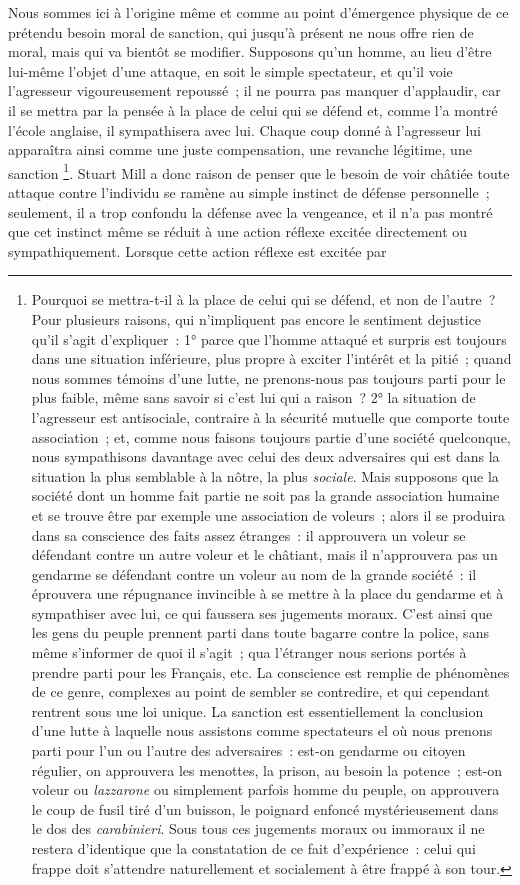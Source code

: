 \documentclass[french,twoside]{book} %
\begin{document}
Nous sommes ici à l’origine même et comme au point d’émergence physique de ce prétendu besoin moral de sanction, qui jusqu’à présent ne nous offre rien de moral, mais qui va bientôt se modifier. Supposons qu’un homme, au lieu d’être lui-même l’objet d’une attaque, en soit le simple spectateur, et qu’il voie l’agresseur vigoureusement repoussé ; il ne pourra pas manquer d’applaudir, car il se mettra par la pensée à la place de celui qui se défend et, comme l’a montré l’école anglaise, il sympathisera avec lui. Chaque coup donné à l’agresseur lui apparaîtra ainsi comme une juste compensation, une revanche légitime, une sanction \footnote{Pourquoi se mettra-t-il à la place de celui qui se défend, et non de l’autre ? Pour plusieurs raisons, qui n’impliquent pas encore le sentiment dejustice qu’il s’agit d’expliquer : 1° parce que l’homme attaqué et surpris est toujours dans une situation inférieure, plus propre à exciter l’intérêt et la pitié ; quand nous sommes témoins d’une lutte, ne prenons-nous pas toujours parti pour le plus faible, même sans savoir si c’est lui qui a raison ? 2° la situation de l’agresseur est antisociale, contraire à la sécurité mutuelle que comporte toute association ; et, comme nous faisons toujours partie d’une société quelconque, nous sympathisons davantage avec celui des deux adversaires qui est dans la situation la plus semblable à la nôtre, la plus \emph{sociale}. Mais supposons que la société dont un homme fait partie ne soit pas la grande association humaine et se trouve être par exemple une association de voleurs ; alors il se produira dans sa conscience des faits assez étranges : il approuvera un voleur se défendant contre un autre voleur et le châtiant, mais il n’approuvera pas un gendarme se défendant contre un voleur au nom de la grande société : il éprouvera une répugnance invincible à se mettre à la place du gendarme et à sympathiser avec lui, ce qui faussera ses jugements moraux. C’est ainsi que les gens du peuple prennent parti dans toute bagarre contre la police, sans même s’informer de quoi il s’agit ; qua l’étranger nous serions portés à prendre parti pour les Français, etc. La conscience est remplie de phénomènes de ce genre, complexes au point de sembler se contredire, et qui cependant rentrent sous une loi unique. La sanction est essentiellement la conclusion d’une lutte à laquelle nous assistons comme spectateurs el où nous prenons parti pour l’un ou l’autre des adversaires : est-on gendarme ou citoyen régulier, on approuvera les menottes, la prison, au besoin la potence ; est-on voleur ou \emph{lazzarone} ou simplement parfois homme du peuple, on approuvera le coup de fusil tiré d’un buisson, le poignard enfoncé mystérieusement dans le dos des \emph{carabinieri}. Sous tous ces jugements moraux ou immoraux il ne restera d’identique que la constatation de ce fait d’expérience : celui qui frappe doit s’attendre naturellement et socialement à être frappé à son tour.}. Stuart Mill a donc raison de penser que le besoin de voir châtiée toute attaque contre l’individu se ramène au simple instinct de défense personnelle ; seulement, il a trop confondu la défense avec la vengeance, et il n’a pas montré que cet instinct même se réduit à une action réflexe excitée directement ou sympathiquement. Lorsque cette action réflexe est excitée par 
\end{document}
